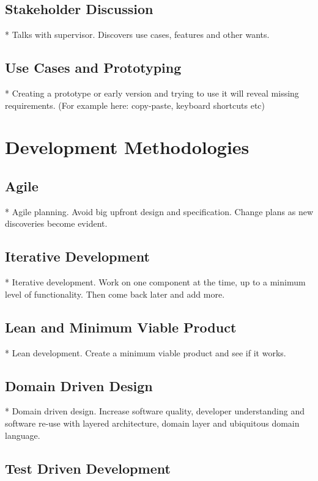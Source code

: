 \subsection{Stakeholder Discussion}

* Talks with supervisor. Discovers use cases, features and other wants.

\subsection{Use Cases and Prototyping}

* Creating a prototype or early version and trying to use it will reveal missing requirements. (For example here: copy-paste, keyboard shortcuts etc)

\section{Development Methodologies}

\subsection{Agile}

* Agile planning. Avoid big upfront design and specification. Change plans as new discoveries become evident.

\subsection{Iterative Development}
* Iterative development. Work on one component at the time, up to a minimum level of functionality. Then come back later and add more.


\subsection{Lean and Minimum Viable Product}

* Lean development. Create a minimum viable product and see if it works.

\subsection{Domain Driven Design}

* Domain driven design. Increase software quality, developer understanding and software re-use with layered architecture, domain layer and ubiquitous domain language.

\subsection{Test Driven Development}

